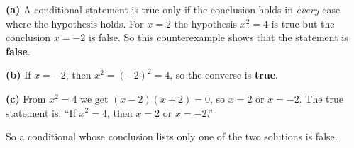 \textbf{(a)} A conditional statement is true only if the conclusion holds in \emph{every} case where the hypothesis holds. For $x=2$ the hypothesis $x^2=4$ is true but the conclusion $x=-2$ is false. So this counterexample shows that the statement is \textbf{false}.

\textbf{(b)} If $x=-2$, then $x^2=(-2)^2=4$, so the converse is \textbf{true}.

\textbf{(c)} From $x^2=4$ we get $(x-2)(x+2)=0$, so $x=2$ or $x=-2$. The true statement is: ``If $x^2=4$, then $x=2$ or $x=-2$.''

So a conditional whose conclusion lists only one of the two solutions is false.
